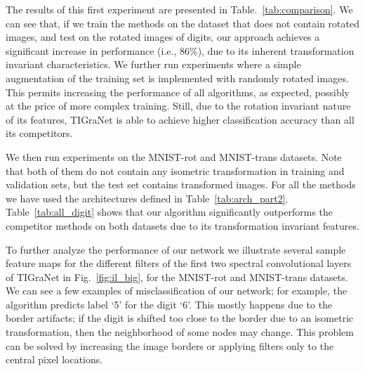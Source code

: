 \documentclass[10pt,journal,compsoc]{IEEEtran}
\begin{document}
	The results of this first experiment are presented in Table.~\ref{tab:comparison}. We can see that, if we train the methods on the dataset that does not contain rotated images, and test on the rotated images of digits, our approach achieves a significant increase in performance (i.e., $86\%$), due to its inherent transformation invariant characteristics. We further run experiments where a simple augmentation of the training set is implemented with randomly rotated images. This permits increasing the performance of all algorithms, as expected, possibly at the price of more complex training. Still, due to the rotation invariant nature of its features, TIGraNet is able to achieve higher classification accuracy than all its competitors.

	We then run experiments on the MNIST-rot and MNIST-trans datasets. Note that both of them do not contain any isometric transformation in training and validation sets, but the test set contains transformed images. For all the methods we have used the architectures defined in Table~\ref{tab:arch_part2}. Table~\ref{tab:all_digit} shows that our algorithm significantly outperforms the competitor methods on both datasets due to its transformation invariant features.

	To further analyze the performance of our network we illustrate several sample feature maps for the different filters of the first two spectral convolutional layers of TIGraNet in Fig.~\ref{fig:il_big}, for the MNIST-rot and MNIST-trans datasets. We can see a few examples of misclassification of our network; for example, the algorithm predicts label `5' for the digit `6'. This mostly happens due to the border artifacts; if the digit is shifted too close to the border due to an isometric transformation, then the neighborhood of some nodes may change.
	This problem can be solved by increasing the image borders or applying filters only to the central pixel locations.
\end{document}
